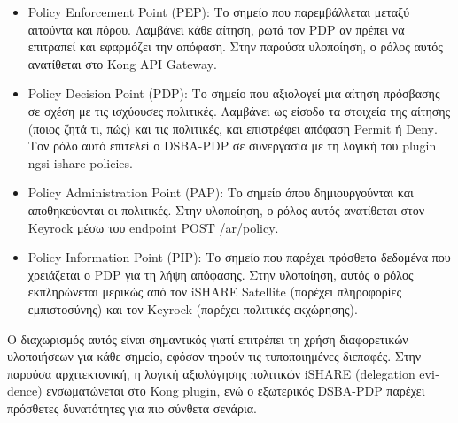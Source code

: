 \begin{itemize}
    \item \textlatin{Policy Enforcement Point (PEP)}: Το
    σημείο που παρεμβάλλεται μεταξύ αιτούντα και πόρου. Λαμβάνει
    κάθε αίτηση, ρωτά τον \textlatin{PDP} αν πρέπει να επιτραπεί
    και εφαρμόζει την απόφαση. Στην παρούσα υλοποίηση, ο ρόλος αυτός
    ανατίθεται στο \textlatin{Kong API Gateway}.
    \item \textlatin{Policy Decision Point (PDP)}: Το
    σημείο που αξιολογεί μια αίτηση πρόσβασης σε σχέση με τις
    ισχύουσες πολιτικές. Λαμβάνει ως είσοδο τα στοιχεία της
    αίτησης (ποιος ζητά τι, πώς) και τις πολιτικές, και επιστρέφει
    απόφαση \textlatin{Permit} ή \textlatin{Deny}. Τον ρόλο αυτό
    επιτελεί ο \textlatin{DSBA-PDP} σε συνεργασία με τη λογική
    του \textlatin{plugin} \textlatin{ngsi-ishare-policies}.
    \item \textlatin{Policy Administration Point (PAP)}:
    Το σημείο όπου δημιουργούνται και αποθηκεύονται οι πολιτικές.
    Στην υλοποίηση, ο ρόλος αυτός ανατίθεται στον \textlatin{Keyrock}
    μέσω του \textlatin{endpoint} \textlatin{POST /ar/policy}.
    \item \textlatin{Policy Information Point (PIP)}:
    Το σημείο που παρέχει πρόσθετα δεδομένα που χρειάζεται ο
    \textlatin{PDP} για τη λήψη απόφασης. Στην υλοποίηση, αυτός
    ο ρόλος εκπληρώνεται μερικώς από τον \textlatin{iSHARE
    Satellite} (παρέχει πληροφορίες εμπιστοσύνης) και τον
    \textlatin{Keyrock} (παρέχει πολιτικές εκχώρησης).
\end{itemize}

Ο διαχωρισμός αυτός είναι σημαντικός γιατί επιτρέπει τη χρήση
διαφορετικών υλοποιήσεων για κάθε σημείο, εφόσον τηρούν τις
τυποποιημένες διεπαφές. Στην παρούσα αρχιτεκτονική, η λογική αξιολόγησης
πολιτικών \textlatin{iSHARE} (\textlatin{delegation evidence}) ενσωματώνεται
στο \textlatin{Kong plugin}, ενώ ο εξωτερικός \textlatin{DSBA-PDP}
παρέχει πρόσθετες δυνατότητες για πιο σύνθετα σενάρια.

